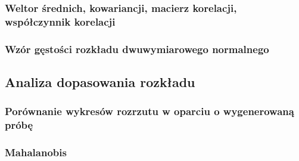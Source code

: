 \documentclass[a4paper,11pt]{article}
\begin{document}
\subsubsection{Weltor średnich, kowariancji, macierz korelacji, współczynnik korelacji}
\subsubsection{Wzór gęstości rozkładu dwuwymiarowego normalnego}
\subsection{Analiza dopasowania rozkładu}
\subsubsection{Porównanie wykresów rozrzutu w oparciu o wygenerowaną próbę}
\subsubsection{Mahalanobis}
\end{document}
